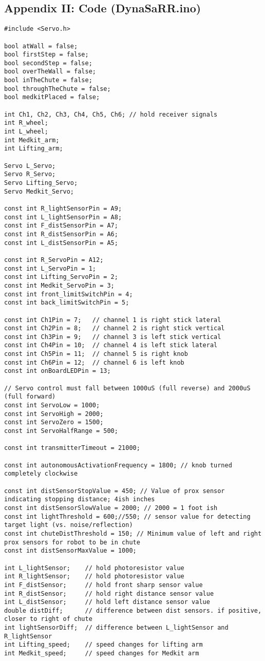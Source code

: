\subsection{Appendix II: Code (DynaSaRR.ino)}
\begin{lstlisting}[style=myArduino]
#include <Servo.h>

bool atWall = false;
bool firstStep = false;
bool secondStep = false;
bool overTheWall = false;
bool inTheChute = false;
bool throughTheChute = false;
bool medkitPlaced = false;

int Ch1, Ch2, Ch3, Ch4, Ch5, Ch6; // hold receiver signals
int R_wheel;
int L_wheel;
int Medkit_arm;
int Lifting_arm;
 
Servo L_Servo;
Servo R_Servo;
Servo Lifting_Servo;
Servo Medkit_Servo;

const int R_lightSensorPin = A9;
const int L_lightSensorPin = A8;
const int F_distSensorPin = A7;
const int R_distSensorPin = A6;
const int L_distSensorPin = A5;

const int R_ServoPin = A12;
const int L_ServoPin = 1;
const int Lifting_ServoPin = 2;
const int Medkit_ServoPin = 3;
const int front_limitSwitchPin = 4;
const int back_limitSwitchPin = 5;

const int Ch1Pin = 7;   // channel 1 is right stick lateral
const int Ch2Pin = 8;   // channel 2 is right stick vertical
const int Ch3Pin = 9;   // channel 3 is left stick vertical
const int Ch4Pin = 10;  // channel 4 is left stick lateral
const int Ch5Pin = 11;  // channel 5 is right knob
const int Ch6Pin = 12;  // channel 6 is left knob
const int onBoardLEDPin = 13;

// Servo control must fall between 1000uS (full reverse) and 2000uS (full forward)
const int ServoLow = 1000;
const int ServoHigh = 2000;
const int ServoZero = 1500;
const int ServoHalfRange = 500;

const int transmitterTimeout = 21000;

const int autonomousActivationFrequency = 1800; // knob turned completely clockwise

const int distSensorStopValue = 450; // Value of prox sensor indicating stopping distance; 4ish inches
const int distSensorSlowValue = 2000; // 2000 = 1 foot ish
const int lightThreshold = 600;//550; // sensor value for detecting target light (vs. noise/reflection)
const int chuteDistThreshold = 150; // Minimum value of left and right prox sensors for robot to be in chute
const int distSensorMaxValue = 1000;

int L_lightSensor;    // hold photoresistor value
int R_lightSensor;    // hold photoresistor value
int F_distSensor;     // hold front sharp sensor value
int R_distSensor;     // hold right distance sensor value
int L_distSensor;     // hold left distance sensor value
double distDiff;      // difference between dist sensors. if positive, closer to right of chute
int lightSensorDiff;  // difference between L_lightSensor and R_lightSensor
int Lifting_speed;    // speed changes for lifting arm
int Medkit_speed;     // speed changes for Medkit arm


\end{lstlisting}
